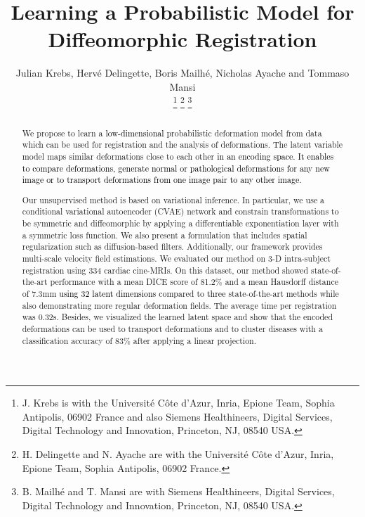 \documentclass[journal]{IEEEtran}
\newcommand{\update}[1]{\textcolor{black}{#1}}
\begin{document}
\title{Learning a Probabilistic Model for \\ Diffeomorphic Registration}
\author{Julian Krebs, Herv\'{e} Delingette, Boris Mailh\'{e}, Nicholas Ayache and Tommaso Mansi

\thanks{J. Krebs is with the Universit\'{e} C\^{o}te d'Azur, Inria, Epione Team, Sophia Antipolis, 06902 France and also Siemens Healthineers, Digital Services, Digital Technology and Innovation, Princeton, NJ, 08540 USA.}%
\thanks{H. Delingette and N. Ayache are with the Universit\'{e} C\^{o}te d'Azur, Inria, Epione Team, Sophia Antipolis, 06902 France.}%
\thanks{B. Mailh\'{e} and T. Mansi are with Siemens Healthineers, Digital Services, Digital Technology and Innovation, Princeton, NJ, 08540 USA.}%
}



\maketitle

\begin{abstract}
We propose to learn a \update{low-dimensional} probabilistic deformation model from data which can be used for registration and the analysis of deformations. The latent variable model maps similar deformations close to each other \update{in an encoding space. It enables to compare deformations, generate normal or pathological deformations for any new image or to transport deformations from one image pair to any other image.}

Our unsupervised method is based on variational inference. In particular, we use a conditional variational autoencoder (CVAE) network and constrain transformations to be symmetric and diffeomorphic by applying a differentiable exponentiation layer with a symmetric loss function. We also present a formulation that includes spatial regularization such as diffusion-based filters. Additionally, our framework provides multi-scale velocity field estimations. 
We evaluated our method on 3-D intra-subject registration using 334 cardiac cine-MRIs. On this dataset, our method showed state-of-the-art performance with a mean DICE score of 81.2\% and a mean Hausdorff distance of 7.3mm \update{using 32 latent dimensions} compared to \update{three} state-of-the-art methods while also demonstrating more regular deformation fields. The average time per registration was 0.32s. Besides, we visualized the learned latent space and show that the encoded deformations can be used to transport deformations and to cluster diseases with a classification accuracy of 83\% after applying a linear projection.
\end{abstract}
\end{document}
